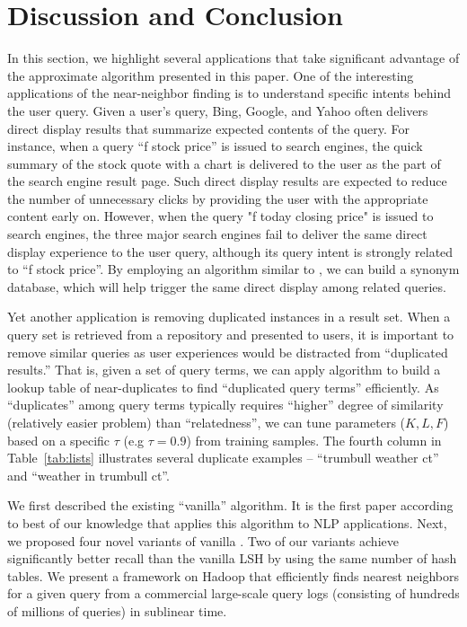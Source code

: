 \section{Discussion and Conclusion}
\label{sec:discuss}
In this section, we highlight several applications that take significant advantage of the approximate \dflipb algorithm presented in this paper.
One of the interesting applications of the near-neighbor finding is to understand specific intents behind the user query. 
Given a user's query, Bing, Google, and Yahoo often delivers direct display results that summarize expected contents of the query. 
For instance, when a query ``f stock price'' is issued  to search engines, the quick summary of the stock quote with a chart is delivered 
to the user as the part of the search engine result page. 
Such direct display results are expected to reduce the number of unnecessary clicks by providing the user with the appropriate content early on. 
However, when the query "f today closing price" is issued to search engines, the three major search engines 
fail to deliver the same direct display experience to the user query, although its query intent is strongly related to ``f stock price''. 
By employing an algorithm similar to \dflipb, we can build a synonym database, 
which will help trigger the same direct display among related queries.

Yet another application is removing duplicated instances in a result set. 
When a query set is retrieved from a repository and presented to users, it is important to remove similar queries as user experiences 
would be distracted from ``duplicated results.'' 
That is, given a set of query terms, we can apply  \dflipb algorithm to build a lookup table of near-duplicates 
to find ``duplicated query terms'' efficiently. As ``duplicates'' among query terms typically requires ``higher'' degree of similarity (relatively easier problem) than ``relatedness'', we can tune parameters ($K, L, F$) based on a specific $\tau$ (e.g $\tau=0.9$) from training samples.  The fourth column in Table~\ref{tab:lists} illustrates several duplicate examples -- ``trumbull weather ct'' and ``weather in trumbull ct''.

We first described the existing ``vanilla'' \lsh algorithm. It is the first paper according to 
best of our knowledge that applies this algorithm to NLP applications. 
Next, we proposed four novel variants of vanilla \lsh. Two of our variants achieve 
significantly better recall than the vanilla LSH by using the same number of hash tables. 
We present a framework on Hadoop that efficiently finds nearest neighbors for a given query from a commercial large-scale query logs (consisting of hundreds of millions of queries) in sublinear time.
